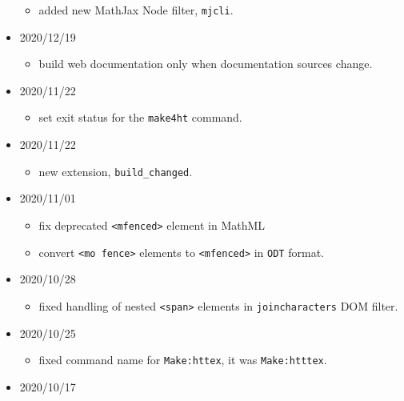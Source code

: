 \begin{itemize}
  \begin{itemize}
  \tightlist
  \item
    added new MathJax Node filter, \texttt{mjcli}.
  \end{itemize}
\item
  2020/12/19

  \begin{itemize}
  \tightlist
  \item
    build web documentation only when documentation sources change.
  \end{itemize}
\item
  2020/11/22

  \begin{itemize}
  \tightlist
  \item
    set exit status for the \texttt{make4ht} command.
  \end{itemize}
\item
  2020/11/22

  \begin{itemize}
  \tightlist
  \item
    new extension, \texttt{build\_changed}.
  \end{itemize}
\item
  2020/11/01

  \begin{itemize}
  \tightlist
  \item
    fix deprecated \texttt{\textless{}mfenced\textgreater{}} element in
    MathML
  \item
    convert \texttt{\textless{}mo\ fence\textgreater{}} elements to
    \texttt{\textless{}mfenced\textgreater{}} in \texttt{ODT} format.
  \end{itemize}
\item
  2020/10/28

  \begin{itemize}
  \tightlist
  \item
    fixed handling of nested \texttt{\textless{}span\textgreater{}}
    elements in \texttt{joincharacters} DOM filter.
  \end{itemize}
\item
  2020/10/25

  \begin{itemize}
  \tightlist
  \item
    fixed command name for \texttt{Make:httex}, it was
    \texttt{Make:htttex}.
  \end{itemize}
\item
  2020/10/17


\end{itemize}
